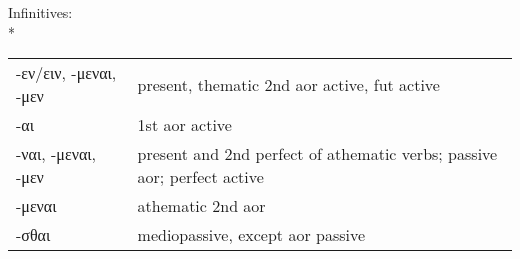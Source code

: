 \begin{small}

\pagebreak


Infinitives:\\*
%
\begin{tabular}{p{1.25in}p{2.75in}}
-εν/ειν, -μεναι, -μεν   &  present, thematic 2nd aor active, fut active \\
-αι\footnotemark[7]    &  1st aor active \\
-ναι, -μεναι, -μεν  & present and 2nd perfect of athematic verbs; passive aor; perfect active \\
-μεναι              &  athematic 2nd aor \\
-σθαι               &  mediopassive, except aor passive \\
\end{tabular}


\end{small}
